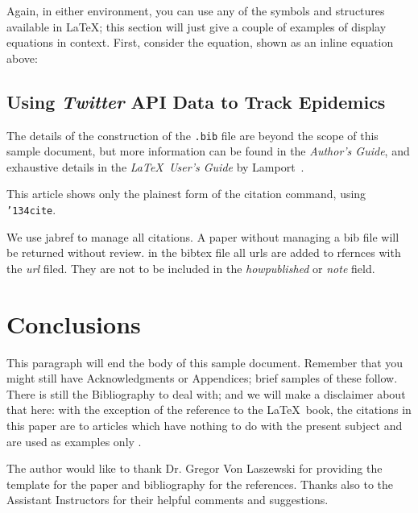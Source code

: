 \documentclass[sigconf]{acmart}
\begin{document}
Again, in either environment, you can use any of the symbols
and structures available in \LaTeX\@; this section will just
give a couple of examples of display equations in context.
First, consider the equation, shown as an inline equation above:


\subsection{Using {\itshape Twitter} API Data to Track Epidemics}

The details of the construction of the \texttt{.bib} file are beyond
the scope of this sample document, but more information can be found
in the \textit{Author's Guide}, and exhaustive details in the
\textit{\LaTeX\ User's Guide} by Lamport~.

This article shows only the plainest form of the citation command,
using \texttt{{\char'134}cite}.

We use jabref to manage all citations. A paper without managing a bib
file will be returned without review. in the bibtex file all urls are
added to rfernces with the {\it url} filed. They are not to be
included in the {\it howpublished} or {\it note} field. 



\section{Conclusions}

This paragraph will end the body of this sample document.  Remember
that you might still have Acknowledgments or Appendices; brief samples
of these follow.  There is still the Bibliography to deal with; and we
will make a disclaimer about that here: with the exception of the
reference to the \LaTeX\ book, the citations in this paper are to
articles which have nothing to do with the present subject and are
used as examples only \cite{Paul2014}.


\begin{acks}

  The author would like to thank Dr. Gregor Von Laszewski for providing the \LaTex template for the paper and \JabRef bibliography for the references. Thanks also to the Assistant Instructors for their helpful comments and suggestions.

\end{acks}


 
\end{document}
